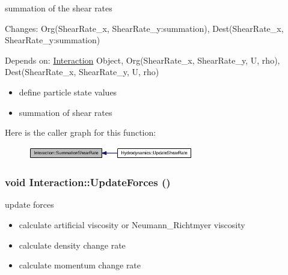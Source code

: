 summation of the shear rates 

Changes: Org(ShearRate\_\-x, ShearRate\_\-y:summation), Dest(ShearRate\_\-x, ShearRate\_\-y:summation)\par
 Depends on: \hyperlink{classInteraction}{Interaction} Object, Org(ShearRate\_\-x, ShearRate\_\-y, U, rho), Dest(ShearRate\_\-x, ShearRate\_\-y, U, rho) 

\begin{itemize}
\item define particle state values\end{itemize}


\begin{itemize}
\item summation of shear rates \end{itemize}


Here is the caller graph for this function:\nopagebreak
\begin{figure}[H]
\begin{center}
\leavevmode
\includegraphics[width=204pt]{classInteraction_98a1dd36fd34e7646aec02e21426562d_icgraph}
\end{center}
\end{figure}
\hypertarget{classInteraction_7d1b68aea03829678cfbe8c5ec3acc2a}{
\subsubsection[{UpdateForces}]{\setlength{\rightskip}{0pt plus 5cm}void Interaction::UpdateForces ()}}
\label{classInteraction_7d1b68aea03829678cfbe8c5ec3acc2a}


update forces 



\begin{itemize}
\item calculate artificial viscosity or Neumann\_\-Richtmyer viscosity\end{itemize}


\begin{itemize}
\item calculate density change rate\end{itemize}


\begin{itemize}
\item calculate momentum change rate\end{itemize}



